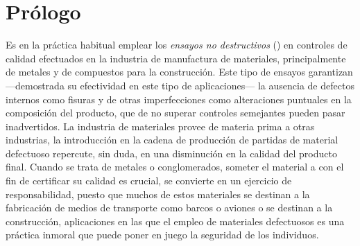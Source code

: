 \chapter{Prólogo}

%

Es en la práctica habitual emplear los \emph{ensayos no destructivos}
() en controles de calidad efectuados en la industria de
manufactura de materiales, principalmente de metales y de compuestos para
la construcción. Este tipo de ensayos garantizan ---demostrada su
efectividad en este tipo de aplicaciones--- la ausencia de defectos
internos como fisuras y de otras imperfecciones como alteraciones puntuales
en la composición del producto, que de no superar controles semejantes
pueden pasar inadvertidos. La industria de materiales provee de materia
prima a otras industrias, la introducción en la cadena de producción de
partidas de material defectuoso repercute, sin duda, en una disminución en
la calidad del producto final. Cuando se trata de metales o conglomerados,
someter el material a  con el fin de certificar su calidad es
crucial, se convierte en un ejercicio de responsabilidad, puesto que muchos
de estos materiales se destinan a la fabricación de medios de transporte
como barcos o aviones o se destinan a la construcción, aplicaciones en las
que el empleo de materiales defectuosos es una práctica inmoral que puede
poner en juego la seguridad de los individuos.

%

